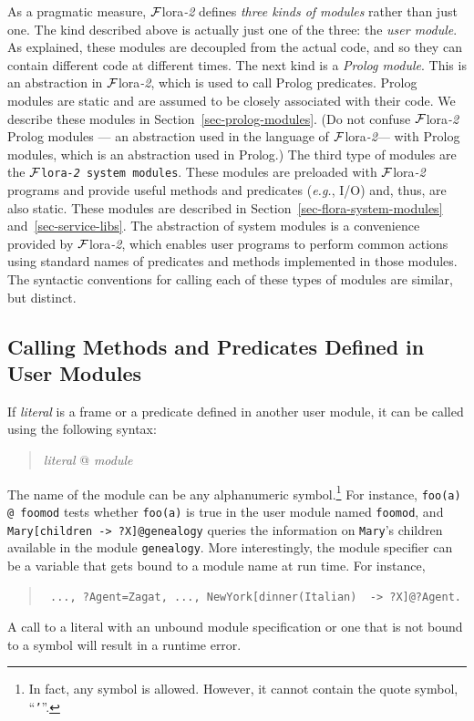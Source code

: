\documentclass[11pt]{article}
\newcommand{\FLSYSTEM}{{\mbox{\sc ${\cal F}${lora}\rm\emph{-2}}}\xspace}
\newcommand{\mvd}{{\mbox{\tt \,->\,}}}  %
\begin{document}
As a pragmatic measure, \FLSYSTEM defines \emph{three kinds of modules} rather
than just one. The kind described above is actually just one of the three:
the \emph{user module}. As explained, these modules are decoupled from the
actual code, and so they can contain different code at different times.
The next kind is a \emph{Prolog module}. This is an abstraction in \FLSYSTEM,
which is used to call Prolog predicates. Prolog modules are static and are
assumed to be closely associated with their code. We describe these modules
in Section~\ref{sec-prolog-modules}. (Do not confuse \FLSYSTEM Prolog modules
--- an abstraction used in the language of \FLSYSTEM --- with Prolog modules,
which is an abstraction used in Prolog.)  The third type of modules are the
{\tt \FLSYSTEM system modules}. These modules are preloaded with \FLSYSTEM
programs and provide useful methods and predicates ({\it e.g.}, I/O) and,
thus, are also static. These modules are described in
Section~\ref{sec-flora-system-modules} and~\ref{sec-service-libs}. The
abstraction of system modules is a convenience provided by \FLSYSTEM, which
enables user programs to perform common actions using standard names of
predicates and methods implemented in those modules. The syntactic
conventions for calling each of these types of modules are similar, but
distinct.


\subsection{Calling Methods and Predicates Defined in User Modules}


%
If \emph{literal} is a frame or a predicate defined in another
user module, it can be called using the following syntax:
\begin{quote}
\emph{literal} @ \emph{module} 
\end{quote}
The name of the module can be any alphanumeric symbol.\footnote{
  In fact, any symbol is allowed. However, it cannot contain the quote
  symbol, ``{\tt '}''.
  }
For instance, \verb|foo(a) @ foomod| tests whether {\tt foo(a)} is true in
the user module named {\tt foomod}, and {\tt Mary[children\mvd ?X]@genealogy}
queries the information on {\tt Mary}'s children available in the module
{\tt genealogy}. More interestingly, the module specifier can be a variable
that gets bound to a module name at run time. For instance, 
\begin{quote}
 {\tt
   ..., ?Agent=Zagat, ..., NewYork[dinner(Italian) \mvd ?X]@?Agent.
   }
\end{quote}
A call to a literal with an unbound module specification or one that is not
bound to a symbol will result in a runtime error.
\end{document}
